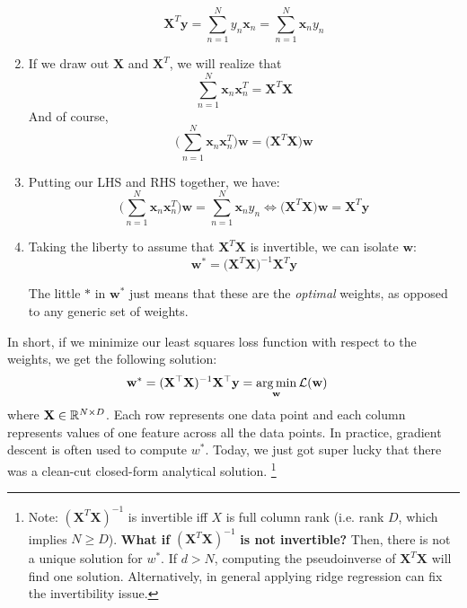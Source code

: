 \documentclass[11pt,letterpaper]{article}
\begin{document}
\begin{enumerate}
    $$\mathbf{X}^{T}\mathbf{y} = \sum_{n=1}^N y_n \mathbf{x}_n = \sum_{n=1}^N \mathbf{x}_n y_n$$
    \item If we draw out $\mathbf{X}$ and $\mathbf{X}^{T}$, we will realize that
    $$\sum_{n=1}^N \mathbf{x}_n \mathbf{x}_n^{T} = \mathbf{X}^{T}\mathbf{X}$$
    And of course,
    $$\bigg(\sum_{n=1}^N \mathbf{x}_n \mathbf{x}_n^{T}\bigg)\mathbf{w} = \bigg(\mathbf{X}^{T}\mathbf{X}\bigg)\mathbf{w}$$
    \item Putting our LHS and RHS together, we have:
    $$\bigg(\sum_{n=1}^N \mathbf{x}_n \mathbf{x}_n^{T}\bigg)\mathbf{w} = \sum_{n=1}^N \mathbf{x}_n y_n \Leftrightarrow \bigg(\mathbf{X}^{T}\mathbf{X}\bigg)\mathbf{w} = \mathbf{X}^{T}\mathbf{y}$$
    \item Taking the liberty to assume that $\mathbf{X}^{T}\mathbf{X}$ is invertible, we can isolate $\mathbf{w}$:
    $$\mathbf{w}^{*} = \bigg(\mathbf{X}^{T}\mathbf{X}\bigg)^{-1}\mathbf{X}^{T}\mathbf{y}$$
    
    The little $*$ in $\mathbf{w^{*}}$ just means that these are the \emph{optimal} weights, as opposed to any generic set of weights.
\end{enumerate}
In short, if we minimize our least squares loss function with respect to the weights, we get the following solution:
\begin{align}
    \mathbf{w}^* &= (\mathbf{X}^\top\mathbf{X})^{-1}\mathbf{X}^\top\mathbf{y} = \argmin_{\mathbf{w}} \mcL(\mathbf{w})
\end{align}
where $\mathbf{X} \in \mathbb{R}^{N \times D}$. Each row represents one data point and each column represents values of one feature across all the data points. In practice, gradient descent is often used to compute $w^*$. Today, we just got super lucky that there was a clean-cut closed-form analytical solution. \footnote{ Note: $(\mathbf X^T \mathbf X)^{-1}$ is invertible iff $X$ is full column rank (i.e. rank $D$, which implies $N \ge D$). \textbf{What if} $(\mathbf X^T \mathbf X)^{-1}$ \textbf{is not invertible?} Then, there is not a unique solution for $w^*$. If $d > N$, computing the pseudoinverse of $\mathbf X^T \mathbf X$ will find one solution. Alternatively, in general applying ridge regression can fix the invertibility issue.}

\end{document}
